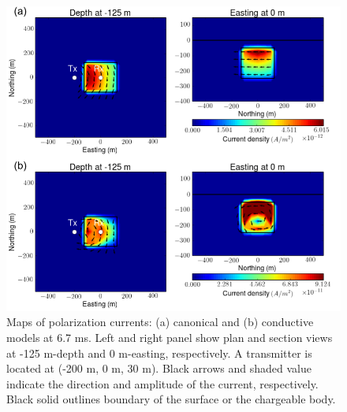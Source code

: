 \documentclass[a4paper, 11pt]{article}
\begin{document}
\begin{figure}[htb]
  \centering
  \includegraphics[width=1\textwidth]{figures/Polarizationcurrent_late.png}
  \caption{Maps of polarization currents: (a) canonical and (b) conductive models at 6.7 ms. Left and right panel show plan and section views at -125 m-depth and 0 m-easting, respectively. A transmitter is located at (-200 m, 0 m, 30 m). Black arrows and shaded value indicate the direction and amplitude of the current, respectively. Black solid outlines boundary of the surface or the chargeable body.}
  \label{F:Polarizationcurrent_late}
\end{figure}
\clearpage

\end{document}
